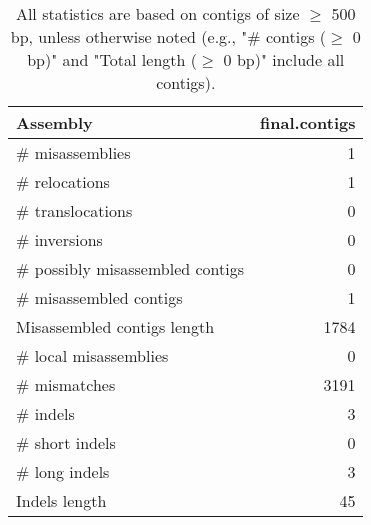 \documentclass[12pt,a4paper]{article}
\begin{document}
\begin{table}[ht]
\begin{center}
\caption{All statistics are based on contigs of size $\geq$ 500 bp, unless otherwise noted (e.g., "\# contigs ($\geq$ 0 bp)" and "Total length ($\geq$ 0 bp)" include all contigs).}
\begin{tabular}{|l*{1}{|r}|}
\hline
Assembly & final.contigs \\ \hline
\# misassemblies & 1 \\ \hline
\hspace{5mm}\# relocations & 1 \\ \hline
\hspace{5mm}\# translocations & 0 \\ \hline
\hspace{5mm}\# inversions & 0 \\ \hline
\# possibly misassembled contigs & 0 \\ \hline
\# misassembled contigs & 1 \\ \hline
Misassembled contigs length & 1784 \\ \hline
\# local misassemblies & 0 \\ \hline
\# mismatches & 3191 \\ \hline
\# indels & 3 \\ \hline
\hspace{5mm}\# short indels & 0 \\ \hline
\hspace{5mm}\# long indels & 3 \\ \hline
Indels length & 45 \\ \hline
\end{tabular}
\end{center}
\end{table}
\end{document}
